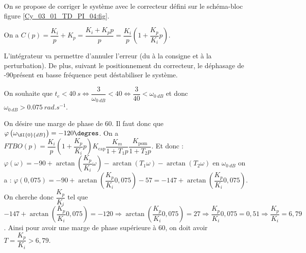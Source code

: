 On se propose de corriger le système avec le correcteur défini sur le schéma-bloc figure \ref{Cy_03_01_TD_PI_04:fig}.


\ifprof
\begin{corrige}
On a $C(p)=\dfrac{K_i}{p}+K_p = \dfrac{K_i+K_p p}{p}= \dfrac{K_i}{p}\left(1+\dfrac{K_p}{K_i} p\right)$.
\end{corrige}
\else
\fi

\ifprof
\begin{corrige}

\end{corrige}
\else
\fi



\ifprof
\begin{corrige}
L'intégrateur va permettre d'annuler l'erreur (du à la consigne et à la perturbation).
De plus, suivant le positionnement du correcteur, le déphasage de -90\degres présent en basse fréquence peut déstabiliser le système.
\end{corrige}
\else
\fi

\ifprof
\begin{corrige}
On souhaite que $t_e<\SI{40}{s} \Leftrightarrow \dfrac{3}{\omega_{\SI{0}{dB}}}<40 \Leftrightarrow \dfrac{3}{40}<\omega_{\SI{0}{dB}}$ et donc $\omega_{\SI{0}{dB}}>\SI{0,075}{rad.s^{-1}}$.
\end{corrige}
\else
\fi

\ifprof
\begin{corrige}
On désire une marge de phase de 60\degres. Il faut donc que $\varphi\left( \omega_{\SI{0}{dB}}\right)=-120\degres$.
On a $FTBO(p)=\dfrac{K_i}{p}\left(1+\dfrac{K_p}{K_i} p\right)K_{\text{cap}}\dfrac{K_m}{1+T_1p}\dfrac{K_{\text{pom}}}{1+T_2p}$. Et donc :
$\varphi(\omega)=-90+\arctan\left( \dfrac{K_p}{K_i}\omega \right)-\arctan\left( T_1\omega \right)-\arctan\left( T_2\omega \right)$ en $\omega_{\SI{0}{dB}}$ on a : $\varphi(0,075)=-90+\arctan\left( \dfrac{K_p}{K_i}0,075\right)-57=-147+\arctan\left( \dfrac{K_p}{K_i}0,075\right)$. On cherche donc $\dfrac{K_p}{K_i}$ tel que $-147+\arctan\left( \dfrac{K_p}{K_i}0,075\right)=-120 \Rightarrow \arctan\left( \dfrac{K_p}{K_i}0,075\right)=27\Rightarrow \dfrac{K_p}{K_i}0,075 = 0,51 \Rightarrow \dfrac{K_p}{K_i}= 6,79$. Ainsi pour avoir une marge de phase supérieure à 60\degres, on doit avoir $T=\dfrac{K_p}{K_i}> 6,79$.
\end{corrige}
\else
\fi

